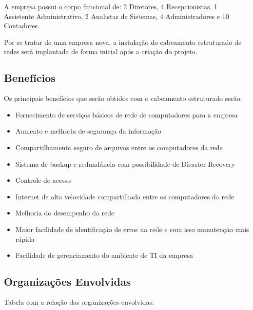 \documentclass[	DIV=calc,%
							paper=a4,%
							fontsize=12pt,%
							onecolumn]{scrartcl}	 					%
\begin{document}
A empresa possui o corpo funcional de: 2 Diretores, 4 Recepcionistas, 1 Assistente Administrativo, 2 Analistas de Sistemas, 4 Administradores e 10 Contadores.

Por se tratar de uma empresa nova, a instalação do cabeamento estruturado de redes será implantada de forma inicial após a criação do projeto.

\subsection{Benefícios}
Os principais benefícios que serão obtidos com o cabeamento estruturado serão:
\begin{itemize}
\item Fornecimento de serviços básicos de rede de computadores para a empresa
\item Aumento e melhoria de segurança da informação
\item Compartilhamento seguro de arquivos entre os computadores da rede
\item Sistema de backup e redundância com possibilidade de Disaster Recovery
\item Controle de acesso
\item Internet de alta velocidade compartilhada entre os computadores da rede
\item Melhoria do desempenho da rede
\item Maior facilidade de identificação de erros na rede e com isso manutenção mais rápida
\item Facilidade de gerenciamento do ambiente de TI da empresa
\end{itemize}
	
\subsection{Organizações Envolvidas}
Tabela com a relação das organizações envolvidas:
\end{document}
